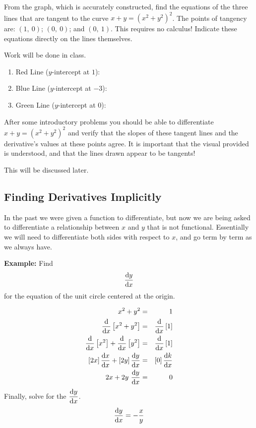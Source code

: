 \documentclass[12pt,addpoints, answers, fleqn]{exam}
\begin{document}
\begin{questions}
\question From the graph, which is accurately constructed, find the equations of the three lines that are tangent to the curve $x+y = \left( x^2 + y^2 \right)^2$. The points of tangency are: $\left( 1, \ 0 \right)$; $\left( 0, \ 0 \right)$; and $\left( 0, \ 1 \right)$. This requires no calculus! Indicate these equations directly on the lines themselves.
\begin{solution}
Work will be done in class.
\begin{enumerate}
\item Red Line ($y$-intercept at $1$):
\item Blue Line ($y$-intercept at $-3$):
\item Green Line ($y$-intercept at $0$):
\end{enumerate}

\end{solution}


\question After some introductory problems you should be able to differentiate  $x+y = \left( x^2 + y^2 \right)^2$ and verify that the slopes of these tangent lines and the derivative's values at these points agree. It is important that the visual provided is understood, and that the lines drawn appear to be tangents!

\begin{solution}
This will be discussed later.
\end{solution}


\end{questions}

\subsection{Finding Derivatives Implicitly}
In the past we were given a function to differentiate, but now we are being asked to differentiate a relationship between $x$ and $y$ that is not functional. Essentially we will need to differentiate both sides with respect to $x$, and go term by term as we always have. 

\textbf{Example:} Find 
\[
\frac{{\rm{d}}y}{{\rm{d}}x}
\]
for the equation of the unit circle centered at the origin.

\begin{solution}
\begin{eqnarray*}
x^2 + y^2 &=& 1\\
\frac{{\rm{d}}}{{\rm{d}}x} \left[ x^2 + y^2 \right] &=& \frac{{\rm{d}}}{{\rm{d}}x} \left[1 \right]\\
\frac{{\rm{d}}}{{\rm{d}}x} \left[ x^2 \right] + \frac{{\rm{d}}}{{\rm{d}}x} \left[ y^2 \right]&=& \frac{{\rm{d}}}{{\rm{d}}x} \left[1 \right]\\
 \left[ 2x \right] \frac{{\rm{d}}x}{{\rm{d}}x} +  \left[ 2 y \right]\frac{{\rm{d}}y}{{\rm{d}}x}&=& \left[0 \right] \frac{{\rm{d}}k}{{\rm{d}}x} \\
2x +  2 y \ \frac{{\rm{d}}y}{{\rm{d}}x}&=& 0
\end{eqnarray*}
Finally, solve for the $\displaystyle \frac{{\rm{d}}y}{{\rm{d}}x}$.
\[
\frac{{\rm{d}}y}{{\rm{d}}x} = -\frac{x}{y}
\]
\end{solution}
\end{document}
